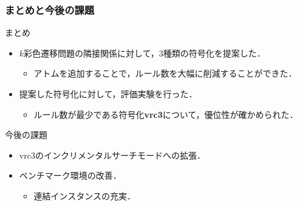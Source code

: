 \documentclass[dvipdfmx,11pt]{beamer}
\begin{document}
\begin{frame}\frametitle{まとめと今後の課題}

  \begin{block}{まとめ}
    \begin{itemize}
      \item $k$彩色遷移問題の隣接関係に対して，3種類の符号化を提案した．
      \begin{itemize}
        \item アトムを追加することで，ルール数を大幅に削減することができた．
      \end{itemize}
      \item 提案した符号化に対して，評価実験を行った．
      \begin{itemize}
        \item ルール数が最少である符号化\textbf{vrc3}について，優位性が確かめられた．
      \end{itemize}
    \end{itemize}
  \end{block}
  
  \begin{alertblock}{今後の課題}
    \begin{itemize}
      \item vrc3の\alert{インクリメンタルサーチモード}への拡張．
      \item ベンチマーク環境の改善．
      \begin{itemize}
        \item 連結インスタンスの充実．
      \end{itemize}
    \end{itemize}
  \end{alertblock}

\end{frame}



\end{document}
